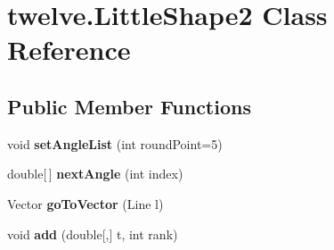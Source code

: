 \hypertarget{classtwelve_1_1_little_shape2}{}\section{twelve.\+Little\+Shape2 Class Reference}
\label{classtwelve_1_1_little_shape2}
\subsection*{Public Member Functions}
\begin{DoxyCompactItemize}
\item 
\hypertarget{classtwelve_1_1_little_shape2_a132e681b0105e7701228442cb196447a}{}void {\bfseries set\+Angle\+List} (int round\+Point=5)\label{classtwelve_1_1_little_shape2_a132e681b0105e7701228442cb196447a}

\item 
\hypertarget{classtwelve_1_1_little_shape2_a5061e87020b45156047b6e735957d22c}{}double\mbox{[}$\,$\mbox{]} {\bfseries next\+Angle} (int index)\label{classtwelve_1_1_little_shape2_a5061e87020b45156047b6e735957d22c}

\item 
\hypertarget{classtwelve_1_1_little_shape2_aa52e7728ab46848d644ca276f6f53b65}{}Vector {\bfseries go\+To\+Vector} (Line l)\label{classtwelve_1_1_little_shape2_aa52e7728ab46848d644ca276f6f53b65}

\item 
\hypertarget{classtwelve_1_1_little_shape2_a109c34991d516f1d7cc176e819275516}{}void {\bfseries add} (double\mbox{[},\mbox{]} t, int rank)\label{classtwelve_1_1_little_shape2_a109c34991d516f1d7cc176e819275516}


\end{DoxyCompactItemize}
